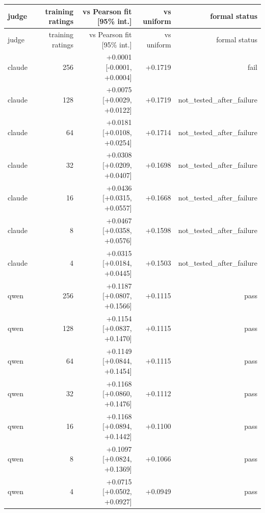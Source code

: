 \begin{longtable}{lrrrr}
\toprule
judge & training ratings & vs Pearson fit [95\% int.] & vs uniform & formal status \\
\midrule
\endfirsthead
\toprule
judge & training ratings & vs Pearson fit [95\% int.] & vs uniform & formal status \\
\midrule
\endhead
claude & 256 & +0.0001 [-0.0001, +0.0004] & +0.1719 & fail \\
claude & 128 & +0.0075 [+0.0029, +0.0122] & +0.1719 & not\_tested\_after\_failure \\
claude & 64 & +0.0181 [+0.0108, +0.0254] & +0.1714 & not\_tested\_after\_failure \\
claude & 32 & +0.0308 [+0.0209, +0.0407] & +0.1698 & not\_tested\_after\_failure \\
claude & 16 & +0.0436 [+0.0315, +0.0557] & +0.1668 & not\_tested\_after\_failure \\
claude & 8 & +0.0467 [+0.0358, +0.0576] & +0.1598 & not\_tested\_after\_failure \\
claude & 4 & +0.0315 [+0.0184, +0.0445] & +0.1503 & not\_tested\_after\_failure \\
qwen & 256 & +0.1187 [+0.0807, +0.1566] & +0.1115 & pass \\
qwen & 128 & +0.1154 [+0.0837, +0.1470] & +0.1115 & pass \\
qwen & 64 & +0.1149 [+0.0844, +0.1454] & +0.1115 & pass \\
qwen & 32 & +0.1168 [+0.0860, +0.1476] & +0.1112 & pass \\
qwen & 16 & +0.1168 [+0.0894, +0.1442] & +0.1100 & pass \\
qwen & 8 & +0.1097 [+0.0824, +0.1369] & +0.1066 & pass \\
qwen & 4 & +0.0715 [+0.0502, +0.0927] & +0.0949 & pass \\
\bottomrule
\end{longtable}
